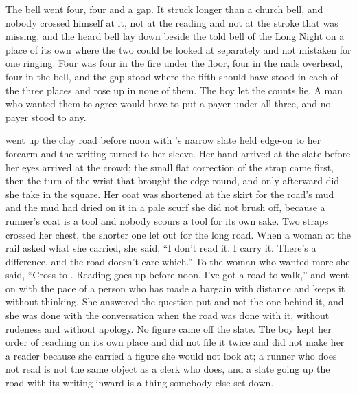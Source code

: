 \scenebreak

The bell went four, four and a gap. It struck longer than a church bell, and nobody crossed himself at it, not at the reading and not at the stroke that was missing, and the heard bell lay down beside the told bell of the Long Night on a place of its own where the two could be looked at separately and not mistaken for one ringing. Four was four in the fire under the floor, four in the nails overhead, four in the bell, and the gap stood where the fifth should have stood in each of the three places and rose up in none of them. The boy let the counts lie. A man who wanted them to agree would have to put a payer under all three, and no payer stood to any.

 went up the clay road before noon with 's narrow slate held edge-on to her forearm and the writing turned to her sleeve. Her hand arrived at the slate before her eyes arrived at the crowd; the small flat correction of the strap came first, then the turn of the wrist that brought the edge round, and only afterward did she take in the square. Her coat was shortened at the skirt for the road's mud and the mud had dried on it in a pale scurf she did not brush off, because a runner's coat is a tool and nobody scours a tool for its own sake. Two straps crossed her chest, the shorter one let out for the long road. When a woman at the rail asked what she carried, she said, “I don't read it. I carry it. There's a difference, and the road doesn't care which.” To the woman who wanted more she said, “Cross to . Reading goes up before noon. I've got a road to walk,” and went on with the pace of a person who has made a bargain with distance and keeps it without thinking. She answered the question put and not the one behind it, and she was done with the conversation when the road was done with it, without rudeness and without apology. No figure came off the slate. The boy kept her order of reaching on its own place and did not file it twice and did not make her a reader because she carried a figure she would not look at; a runner who does not read is not the same object as a clerk who does, and a slate going up the road with its writing inward is a thing somebody else set down.

